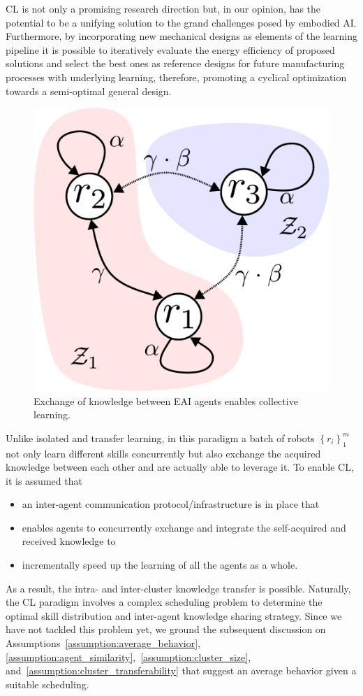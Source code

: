 CL is not only a promising research direction but, in our opinion, has the potential to be a unifying solution to the grand challenges posed by embodied AI. Furthermore, by incorporating new mechanical designs as elements of the learning pipeline it is possible to iteratively evaluate the energy efficiency of proposed solutions and select the best ones as reference designs for future manufacturing processes with underlying learning, therefore, promoting a cyclical optimization towards a semi-optimal general design.
\begin{figure}[!th]
	\centering
	\includegraphics[width=0.7\columnwidth]{fig/cl_example_figure.pdf}
	\caption{Exchange of knowledge between EAI agents enables collective learning.}
	\label{fig:cl_example_figure}
\end{figure}

Unlike isolated and transfer learning, in this paradigm a batch of robots $\left \lbrace r_i \right \rbrace^m_{1}$ not only learn different skills concurrently but also exchange the acquired knowledge between each other and are actually able to leverage it. To enable CL, it is assumed that
\begin{itemize}
	\item an inter-agent communication protocol/infrastructure is in place that
	\item enables agents to concurrently exchange and integrate the self-acquired and received knowledge to
	\item incrementally speed up the learning of all the agents as a whole.
\end{itemize}
As a result, the intra- and inter-cluster knowledge transfer is possible. Naturally, the CL paradigm involves a complex scheduling problem to determine the optimal skill distribution and inter-agent knowledge sharing strategy. Since we have not tackled this problem yet, we ground the subsequent discussion on Assumptions~\ref{assumption:average_behavior}, \ref{assumption:agent_similarity},~\ref{assumption:cluster_size}, and~\ref{assumption:cluster_transferability} that suggest an average behavior given a suitable scheduling.


